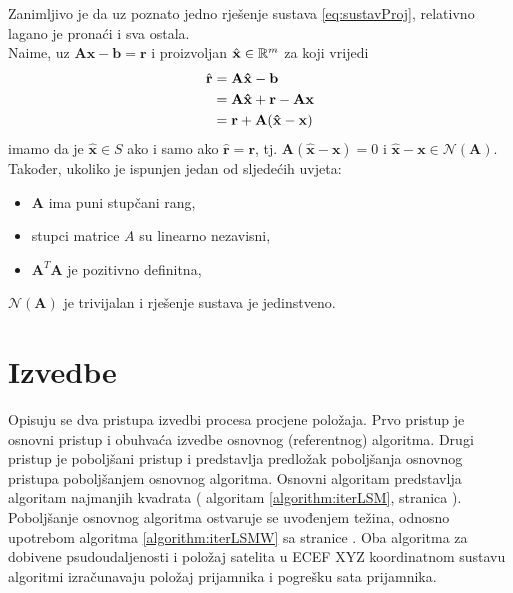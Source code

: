 \documentclass[a4paper,twoside,12pt]{memoir} %
\begin{document}


Zanimljivo je da uz poznato
jedno rješenje sustava \ref{eq:sustavProj}, relativno lagano je pronaći i sva ostala.\\
Naime, uz $\mathbf{A}\mathbf{x} - \mathbf{b} = \mathbf{r}$ i proizvoljan $\hat{\mathbf{x}} \in \mathbb{R}^m$ za koji vrijedi
\begin{align}
\hat{\mathbf{r}}  &=  \mathbf{A}\mathbf{\hat{x}} - \mathbf{b} \notag \\
&= \mathbf{A}\mathbf{\hat{x}} + \mathbf{r} - \mathbf{A}\mathbf{x} \\
&= \mathbf{r} + \mathbf{A}(\mathbf{\hat{x}} - \mathbf{x}) \notag
\end{align}
imamo da je $\mathbf{\hat{x}} \in S$ ako i samo ako $\hat{\mathbf{r}} = \mathbf{r}$, tj.  $ \mathbf{A}(\mathbf{\hat{x}} - \mathbf{x}) = 0$ i $\mathbf{\hat{x}} - \mathbf{x} \in \mathcal{N}(\mathbf{A})$.\\
Također, ukoliko je ispunjen jedan od sljedećih uvjeta:%
\begin{itemize}
	\item $\mathbf{A}$ ima puni stupčani rang,
	\item stupci matrice $A$ su linearno nezavisni,
	\item $\mathbf{A}^T\mathbf{A}$ je pozitivno definitna,
\end{itemize}
$\mathcal{N}(\mathbf{A})$ je trivijalan i rješenje sustava je jedinstveno. 
\vspace{0.2cm}

\section{Izvedbe}

Opisuju se dva pristupa izvedbi procesa procjene položaja.
Prvo pristup je osnovni pristup i obuhvaća izvedbe osnovnog (referentnog) algoritma. Drugi pristup je poboljšani pristup i predstavlja predložak  poboljšanja osnovnog pristupa poboljšanjem osnovnog algoritma.
Osnovni algoritam predstavlja algoritam najmanjih kvadrata ( algoritam \ref{algorithm:iterLSM}, stranica \pageref{algorithm:iterLSM}).
Poboljšanje osnovnog algoritma ostvaruje se uvođenjem težina, odnosno upotrebom algoritma \ref{algorithm:iterLSMW} sa stranice \pageref{algorithm:iterLSMW}.
Oba algoritma za dobivene psudoudaljenosti i 
položaj satelita u ECEF XYZ koordinatnom sustavu algoritmi izračunavaju položaj
prijamnika i pogrešku sata prijamnika.\\ 
\end{document}
